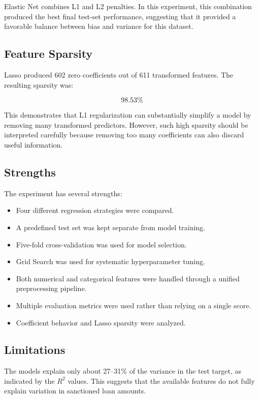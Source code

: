 \documentclass[12pt,a4paper]{article}
\begin{document}
Elastic Net combines L1 and L2 penalties. In this experiment, this combination produced the best final test-set performance, suggesting that it provided a favorable balance between bias and variance for this dataset.

\subsection{Feature Sparsity}

Lasso produced 602 zero coefficients out of 611 transformed features. The resulting sparsity was:

\[
98.53\%
\]

This demonstrates that L1 regularization can substantially simplify a model by removing many transformed predictors. However, such high sparsity should be interpreted carefully because removing too many coefficients can also discard useful information.

\subsection{Strengths}

The experiment has several strengths:

\begin{itemize}
    \item Four different regression strategies were compared.
    \item A predefined test set was kept separate from model training.
    \item Five-fold cross-validation was used for model selection.
    \item Grid Search was used for systematic hyperparameter tuning.
    \item Both numerical and categorical features were handled through a unified preprocessing pipeline.
    \item Multiple evaluation metrics were used rather than relying on a single score.
    \item Coefficient behavior and Lasso sparsity were analyzed.
\end{itemize}

\subsection{Limitations}

The models explain only about 27--31\% of the variance in the test target, as indicated by the $R^2$ values. This suggests that the available features do not fully explain variation in sanctioned loan amounts.
\end{document}
